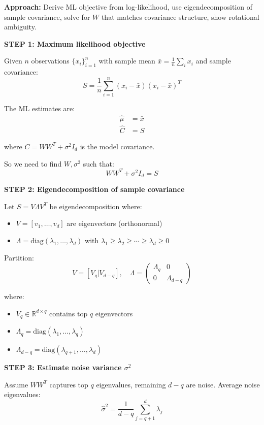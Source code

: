 \documentclass[12pt]{article}
\begin{document}
\begin{solution}

\textbf{Approach:} Derive ML objective from log-likelihood, use eigendecomposition of sample covariance, solve for $W$ that matches covariance structure, show rotational ambiguity.

\textbf{STEP 1: Maximum likelihood objective}

Given $n$ observations $\{x_i\}_{i=1}^n$ with sample mean $\bar{x} = \frac{1}{n}\sum_i x_i$ and sample covariance:
\[
S = \frac{1}{n}\sum_{i=1}^n (x_i - \bar{x})(x_i - \bar{x})^T
\]

The ML estimates are:
\begin{align*}
\hat{\mu} &= \bar{x} \\
\hat{C} &= S
\end{align*}

where $C = WW^T + \sigma^2 I_d$ is the model covariance.

So we need to find $W, \sigma^2$ such that:
\[
WW^T + \sigma^2 I_d = S
\]

\textbf{STEP 2: Eigendecomposition of sample covariance}

Let $S = V\Lambda V^T$ be eigendecomposition where:
\begin{itemize}
    \item $V = [v_1, \ldots, v_d]$ are eigenvectors (orthonormal)
    \item $\Lambda = \text{diag}(\lambda_1, \ldots, \lambda_d)$ with $\lambda_1 \geq \lambda_2 \geq \cdots \geq \lambda_d \geq 0$
\end{itemize}

Partition:
\[
V = [V_q | V_{d-q}], \quad \Lambda = \begin{pmatrix}
\Lambda_q & 0 \\
0 & \Lambda_{d-q}
\end{pmatrix}
\]

where:
\begin{itemize}
    \item $V_q \in \mathbb{R}^{d \times q}$ contains top $q$ eigenvectors
    \item $\Lambda_q = \text{diag}(\lambda_1, \ldots, \lambda_q)$
    \item $\Lambda_{d-q} = \text{diag}(\lambda_{q+1}, \ldots, \lambda_d)$
\end{itemize}

\textbf{STEP 3: Estimate noise variance $\sigma^2$}

Assume $WW^T$ captures top $q$ eigenvalues, remaining $d-q$ are noise. Average noise eigenvalues:
\[
\hat{\sigma}^2 = \frac{1}{d-q}\sum_{j=q+1}^d \lambda_j
\]


\end{solution}
\end{document}

